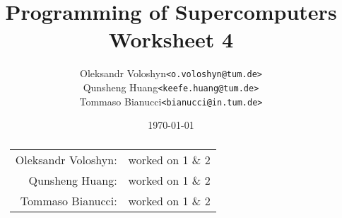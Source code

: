 \documentclass{article}
\title{Programming of Supercomputers\\Worksheet 4}
\author{
	\begin{tabular}{rl}
		Oleksandr Voloshyn& \texttt{<o.voloshyn@tum.de>}\\ 
		Qunsheng Huang& \texttt{<keefe.huang@tum.de>}\\ 
		Tommaso Bianucci& \texttt{<bianucci@in.tum.de>}
	\end{tabular}
}
\date{\today}
\begin{document}
\maketitle
\renewcommand{\abstractname}{Group members's contributions}
\begin{abstract}
	\begin{center}
		\begin{tabular}{rl}
		Oleksandr Voloshyn:& worked on 1 \& 2\\
		Qunsheng Huang:& worked on 1 \& 2\\
		Tommaso Bianucci:& worked on 1 \& 2\\
		\end{tabular}
	\end{center}
\end{abstract}



\end{document}
